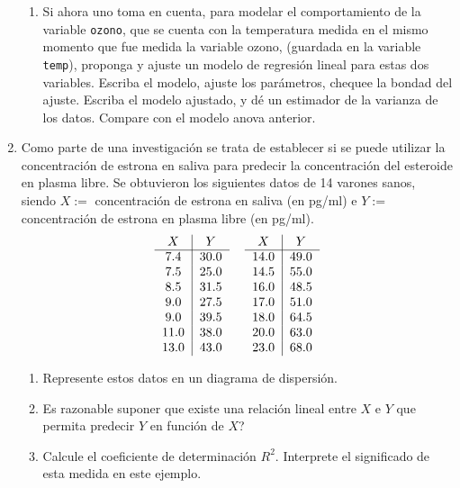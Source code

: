\documentclass[11pt,a4paper,twoside]{article}%
\begin{document}
\begin{enumerate}
\begin{enumerate}
\item Si ahora uno toma en cuenta, para modelar el comportamiento de la
variable \texttt{ozono}, que se cuenta con la temperatura medida en el mismo
momento que fue medida la variable ozono, (guardada en la variable
\texttt{temp}), proponga y ajuste un modelo de regresi\'{o}n lineal para estas
dos variables. Escriba el modelo, ajuste los par\'{a}metros, chequee la bondad
del ajuste. Escriba el modelo ajustado, y d\'{e} un estimador de la varianza
de los datos. Compare con el modelo anova anterior.
\end{enumerate}
\item Como parte de una investigaci\'{o}n se trata de establecer si se puede
utilizar la concentraci\'{o}n de estrona en saliva para predecir la
concentraci\'{o}n del esteroide en plasma libre. Se obtuvieron los siguientes
datos de 14 varones sanos, siendo $X:=$ concentraci\'{o}n de estrona en saliva
(en pg/ml) e $Y:=$ concentraci\'{o}n de estrona en plasma libre (en pg/ml).%
\[%
\begin{tabular}
[c]{ccccc}%
$X$ & \multicolumn{1}{|c}{$Y$} &  & $X$ & \multicolumn{1}{|c}{$Y$%
}\\\cline{1-2}\cline{4-5}%
7.4 & \multicolumn{1}{|c}{30.0} &  & 14.0 & \multicolumn{1}{|c}{49.0}\\
7.5 & \multicolumn{1}{|c}{25.0} &  & 14.5 & \multicolumn{1}{|c}{55.0}\\
8.5 & \multicolumn{1}{|c}{31.5} &  & 16.0 & \multicolumn{1}{|c}{48.5}\\
9.0 & \multicolumn{1}{|c}{27.5} &  & 17.0 & \multicolumn{1}{|c}{51.0}\\
9.0 & \multicolumn{1}{|c}{39.5} &  & 18.0 & \multicolumn{1}{|c}{64.5}\\
11.0 & \multicolumn{1}{|c}{38.0} &  & 20.0 & \multicolumn{1}{|c}{63.0}\\
13.0 & \multicolumn{1}{|c}{43.0} &  & 23.0 & \multicolumn{1}{|c}{68.0}%
\end{tabular}
\]


\begin{enumerate}
	\item Represente estos datos en un diagrama de dispersi\'{o}n.
	
	\item \textquestiondown Es razonable suponer que existe una relaci\'{o}n
	lineal entre $X$ e $Y$ que permita predecir $Y$ en funci\'{o}n de $X$?
	
	\item Calcule el coeficiente de determinaci\'{o}n $R^{2}$. Interprete el
	significado de esta medida en este ejemplo.
\end{enumerate}


\end{enumerate}
\end{document}
